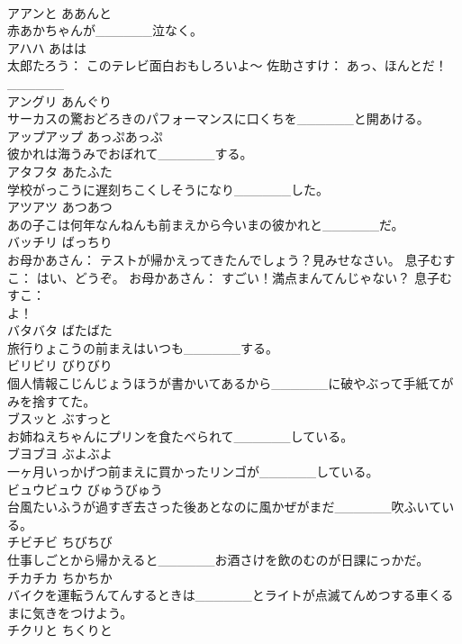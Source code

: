 \documentclass[8pt]{extreport}
\begin{document}
\begin{CJK}{UTF8}{min}
\\	アアンと	ああんと	
\\	赤あかちゃんが______泣なく。	
\\	アハハ	あはは	
\\	太郎たろう： このテレビ面白おもしろいよ～ 佐助さすけ： あっ、ほんとだ！______	
\\	アングリ	あんぐり	
\\	サーカスの驚おどろきのパフォーマンスに口くちを______と開あける。	
\\	アップアップ	あっぷあっぷ	
\\	彼かれは海うみでおぼれて______する。	
\\	アタフタ	あたふた	
\\	学校がっこうに遅刻ちこくしそうになり______した。	
\\	アツアツ	あつあつ	
\\	あの子こは何年なんねんも前まえから今いまの彼かれと______だ。	
\\	バッチリ	ばっちり	
\\	お母かあさん： テストが帰かえってきたんでしょう？見みせなさい。 息子むすこ： はい、どうぞ。 お母かあさん： すごい！満点まんてんじゃない？ 息子むすこ： 
\\	よ！	
\\	バタバタ	ばたばた	
\\	旅行りょこうの前まえはいつも______する。	
\\	ビリビリ	びりびり	
\\	個人情報こじんじょうほうが書かいてあるから______に破やぶって手紙てがみを捨すてた。	
\\	ブスッと	ぶすっと	
\\	お姉ねえちゃんにプリンを食たべられて______している。	
\\	ブヨブヨ	ぶよぶよ	
\\	一ヶ月いっかげつ前まえに買かったリンゴが______している。	
\\	ビュウビュウ	びゅうびゅう	
\\	台風たいふうが過すぎ去さった後あとなのに風かぜがまだ______吹ふいている。	
\\	チビチビ	ちびちび	
\\	仕事しごとから帰かえると______お酒さけを飲のむのが日課にっかだ。	
\\	チカチカ	ちかちか	
\\	バイクを運転うんてんするときは______とライトが点滅てんめつする車くるまに気きをつけよう。	
\\	チクリと	ちくりと	

\end{CJK}
\end{document}
